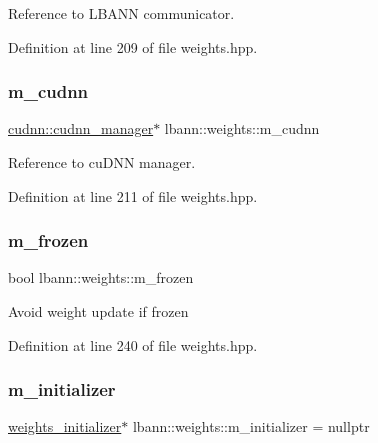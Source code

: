 Reference to L\+B\+A\+NN communicator. 

Definition at line 209 of file weights.\+hpp.

\mbox{\label{classlbann_1_1weights_a873e8c14998915e442d03b8dd7d2fdf7}} 
\subsubsection{\texorpdfstring{m\+\_\+cudnn}{m\_cudnn}}
{\footnotesize\ttfamily \hyperlink{classlbann_1_1cudnn_1_1cudnn__manager}{cudnn\+::cudnn\+\_\+manager}$\ast$ lbann\+::weights\+::m\+\_\+cudnn\hspace{0.3cm}{\ttfamily [private]}}

Reference to cu\+D\+NN manager. 

Definition at line 211 of file weights.\+hpp.

\mbox{\label{classlbann_1_1weights_a3962305112ba98ef2eb89c6f7035f6dd}} 
\subsubsection{\texorpdfstring{m\+\_\+frozen}{m\_frozen}}
{\footnotesize\ttfamily bool lbann\+::weights\+::m\+\_\+frozen\hspace{0.3cm}{\ttfamily [private]}}

Avoid weight update if frozen 

Definition at line 240 of file weights.\+hpp.

\mbox{\label{classlbann_1_1weights_a3ddbcce8d543e975efeebdb43e82444c}} 
\subsubsection{\texorpdfstring{m\+\_\+initializer}{m\_initializer}}
{\footnotesize\ttfamily \hyperlink{classlbann_1_1weights__initializer}{weights\+\_\+initializer}$\ast$ lbann\+::weights\+::m\+\_\+initializer = nullptr\hspace{0.3cm}{\ttfamily [private]}}

